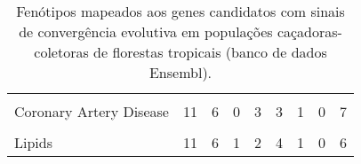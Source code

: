 \begin{table}[!ht]
{\begin{tabular}[!ht]{lrrrrrrrr}
\cellcolor{gray!6}{Respiratory Function Tests} & \cellcolor{gray!6}{12} & \cellcolor{gray!6}{7} & \cellcolor{gray!6}{1} & \cellcolor{gray!6}{2} & \cellcolor{gray!6}{5} & \cellcolor{gray!6}{1} & \cellcolor{gray!6}{0} & \cellcolor{gray!6}{9}\\
Coronary Artery Disease & 11 & 6 & 0 & 3 & 3 & 1 & 0 & 7\\
\cellcolor{gray!6}{Hemoglobin S} & \cellcolor{gray!6}{11} & \cellcolor{gray!6}{5} & \cellcolor{gray!6}{1} & \cellcolor{gray!6}{2} & \cellcolor{gray!6}{4} & \cellcolor{gray!6}{1} & \cellcolor{gray!6}{1} & \cellcolor{gray!6}{5}\\
Lipids & 11 & 6 & 1 & 2 & 4 & 1 & 0 & 6\\
\bottomrule

\end{tabular}}

\caption{Fenótipos mapeados aos genes candidatos com sinais de convergência evolutiva em populações caçadoras-coletoras de florestas tropicais (banco de dados Ensembl).}
\label{tab:metanalysis_ensembl}

\end{table}
